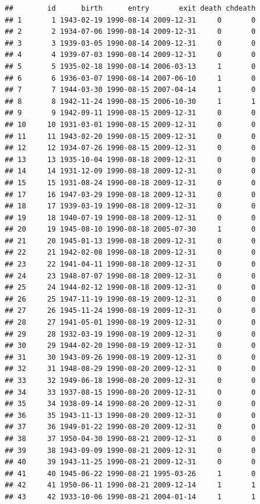 \documentclass[
]{book}
\begin{document}
\begin{verbatim}
##        id      birth      entry       exit death chdeath
## 1       1 1943-02-19 1990-08-14 2009-12-31     0       0
## 2       2 1934-07-06 1990-08-14 2009-12-31     0       0
## 3       3 1939-03-05 1990-08-14 2009-12-31     0       0
## 4       4 1939-07-03 1990-08-14 2009-12-31     0       0
## 5       5 1935-02-18 1990-08-14 2006-03-13     1       0
## 6       6 1936-03-07 1990-08-14 2007-06-10     1       0
## 7       7 1944-03-30 1990-08-15 2007-04-14     1       0
## 8       8 1942-11-24 1990-08-15 2006-10-30     1       1
## 9       9 1942-09-11 1990-08-15 2009-12-31     0       0
## 10     10 1931-03-01 1990-08-15 2009-12-31     0       0
## 11     11 1943-02-20 1990-08-15 2009-12-31     0       0
## 12     12 1934-07-26 1990-08-15 2009-12-31     0       0
## 13     13 1935-10-04 1990-08-18 2009-12-31     0       0
## 14     14 1931-12-09 1990-08-18 2009-12-31     0       0
## 15     15 1931-08-24 1990-08-18 2009-12-31     0       0
## 17     16 1947-03-29 1990-08-18 2009-12-31     0       0
## 18     17 1939-03-19 1990-08-18 2009-12-31     0       0
## 19     18 1940-07-19 1990-08-18 2009-12-31     0       0
## 20     19 1945-08-10 1990-08-18 2005-07-30     1       0
## 21     20 1945-01-13 1990-08-18 2009-12-31     0       0
## 22     21 1942-02-08 1990-08-18 2009-12-31     0       0
## 23     22 1941-04-11 1990-08-18 2009-12-31     0       0
## 24     23 1948-07-07 1990-08-18 2009-12-31     0       0
## 25     24 1944-02-12 1990-08-18 2009-12-31     0       0
## 26     25 1947-11-19 1990-08-19 2009-12-31     0       0
## 27     26 1945-11-24 1990-08-19 2009-12-31     0       0
## 28     27 1941-05-01 1990-08-19 2009-12-31     0       0
## 29     28 1932-03-19 1990-08-19 2009-12-31     0       0
## 30     29 1944-02-20 1990-08-19 2009-12-31     0       0
## 31     30 1943-09-26 1990-08-19 2009-12-31     0       0
## 32     31 1948-08-29 1990-08-20 2009-12-31     0       0
## 33     32 1949-06-18 1990-08-20 2009-12-31     0       0
## 34     33 1937-08-15 1990-08-20 2009-12-31     0       0
## 35     34 1938-09-14 1990-08-20 2009-12-31     0       0
## 36     35 1943-11-13 1990-08-20 2009-12-31     0       0
## 37     36 1949-01-22 1990-08-20 2009-12-31     0       0
## 38     37 1950-04-30 1990-08-21 2009-12-31     0       0
## 39     38 1943-09-09 1990-08-21 2009-12-31     0       0
## 40     39 1943-11-25 1990-08-21 2009-12-31     0       0
## 41     40 1945-06-22 1990-08-21 1995-03-26     1       0
## 42     41 1950-06-11 1990-08-21 2009-12-14     1       1
## 43     42 1933-10-06 1990-08-21 2004-01-14     1       1

\end{verbatim}
\end{document}
